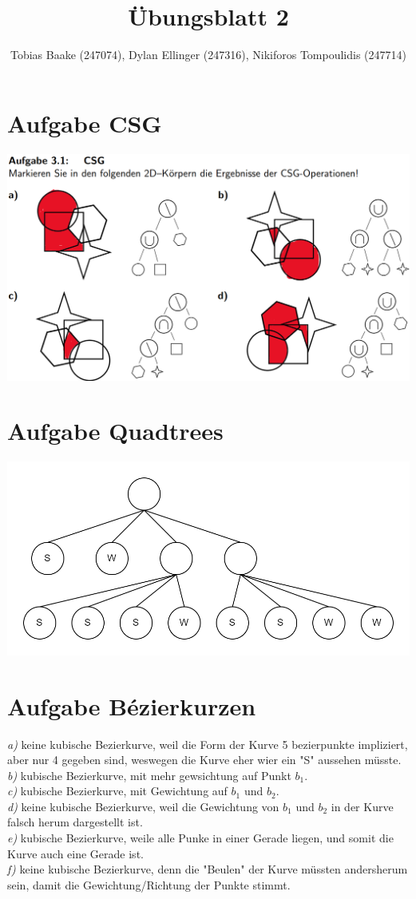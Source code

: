 \documentclass{article}
\title{Übungsblatt 2}
\author{Tobias Baake (247074), Dylan Ellinger (247316), Nikiforos Tompoulidis (247714)}
\begin{document}
\maketitle

\section{Aufgabe CSG}
\includegraphics[width=400pt]{./files/Übung3.1.png}

\section{Aufgabe Quadtrees}
\includegraphics[width=400pt]{./files/Übung3.2.drawio.png}

\section{Aufgabe Bézierkurzen}

\emph{a)}
keine kubische Bezierkurve, weil die Form der Kurve 5 bezierpunkte impliziert, aber nur 4 gegeben sind, weswegen die Kurve eher wier ein "S" aussehen müsste.
\\
\emph{b)}
kubische Bezierkurve, mit mehr gewsichtung auf Punkt $b_1$.
\\
\emph{c)}
kubische Bezierkurve, mit Gewichtung auf $b_1$ und $b_2$.
\\
\emph{d)}
keine kubische Bezierkurve, weil die Gewichtung von $b_1$ und $b_2$ in der Kurve falsch herum dargestellt ist.
\\
\emph{e)}
kubische Bezierkurve, weile alle Punke in einer Gerade liegen, und somit die Kurve auch eine Gerade ist.
\\
\emph{f)}
keine kubische Bezierkurve, denn die "Beulen" der Kurve müssten andersherum sein, damit die Gewichtung/Richtung der Punkte stimmt.
\end{document}
